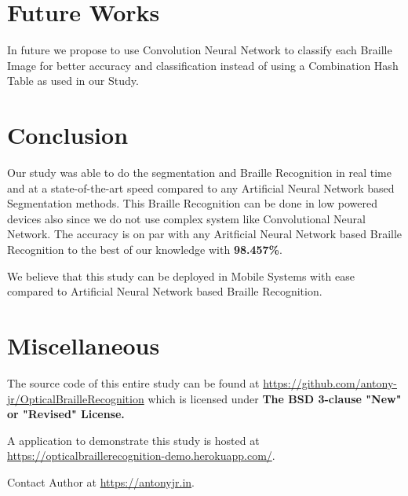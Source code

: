 \documentclass{article}
\begin{document}
\section{Future Works}

In future we propose to use Convolution Neural Network to classify each Braille Image for better accuracy and classification instead of using a Combination Hash Table as used in our Study.


\section{Conclusion}

Our study was able to do the segmentation and Braille Recognition in real time and at a state-of-the-art speed compared to any Artificial Neural Network based Segmentation methods. This Braille Recognition can be done in low powered devices also since we do not use complex system like Convolutional Neural Network. The accuracy is on par with any Aritficial Neural Network based Braille Recognition to the best of our knowledge with \textbf{98.457\%}.

We believe that this study can be deployed in Mobile Systems with ease compared to Artificial Neural Network based Braille Recognition.



\section{Miscellaneous}

The source code of this entire study can be found at \url{https://github.com/antony-jr/OpticalBrailleRecognition} which is licensed under \textbf{The BSD 3-clause "New" or "Revised" License.}

A application to demonstrate this study is hosted at \url{https://opticalbraillerecognition-demo.herokuapp.com/}.

Contact Author at \url{https://antonyjr.in}.
\end{document}

